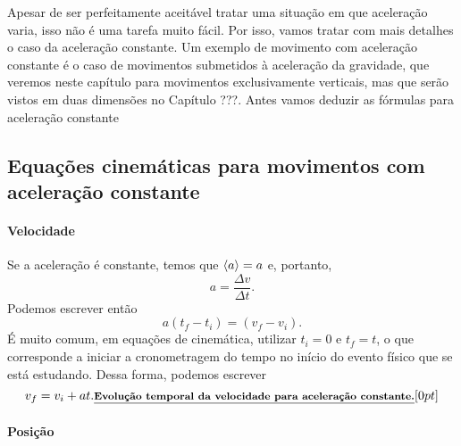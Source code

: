 Apesar de ser perfeitamente aceitável tratar uma situação em que aceleração varia, isso não é uma tarefa muito fácil. Por isso, vamos tratar com mais detalhes o caso da aceleração constante. Um exemplo de movimento com aceleração constante é o caso de movimentos submetidos à aceleração da gravidade, que veremos neste capítulo para movimentos exclusivamente verticais, mas que serão vistos em duas dimensões no Capítulo ???. Antes vamos deduzir as fórmulas para aceleração constante

\subsection{Equações cinemáticas para movimentos com aceleração constante}

\paragraph{Velocidade}

Se a aceleração é constante, temos que $\left\langle{a}\right\rangle = a$ e, portanto,
\begin{equation}
  a = \frac{\Delta v}{\Delta t}.
\end{equation}
%
Podemos escrever então
\begin{equation}
  a (t_f - t_i) = (v_f - v_i).
\end{equation}
%
É muito comum, em equações de cinemática, utilizar $t_i = 0$ e $t_f = t$, o que corresponde a iniciar a cronometragem do tempo no início do evento físico que se está estudando. Dessa forma, podemos escrever
\begin{equation}\label{Eq:VV0AT}
  v_f = v_i + at.\relax{\footnotesize\emph{\textbf{Evolução temporal da velocidade para aceleração constante.}}}[0pt]
\end{equation}

\paragraph{Posição}

